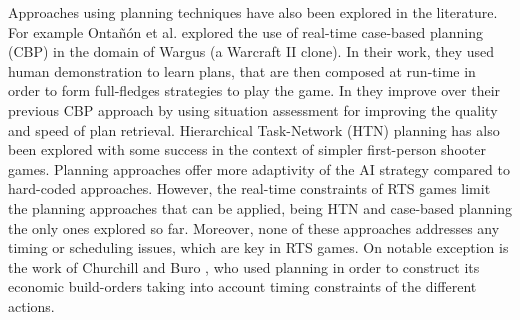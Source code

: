 \documentclass[journal]{IEEEtran}
\begin{document}


Approaches using planning techniques have also been explored in the literature. For example Onta\~{n}\'{o}n et al. \cite{CBR_Planning} explored the use of real-time case-based planning (CBP) in the domain of Wargus (a Warcraft II clone). In their work, they used human demonstration to learn plans, that are then composed at run-time in order to form full-fledges strategies to play the game. In \cite{PlanRetrieval} they improve over  their previous CBP approach by using situation assessment for improving the quality and speed of plan retrieval. Hierarchical Task-Network (HTN) planning has also been explored with some success in the context of simpler first-person shooter games. Planning approaches offer more adaptivity of the AI strategy compared to hard-coded approaches. However, the real-time constraints of RTS games limit the planning approaches that can be applied, being HTN and case-based planning the only ones explored so far. Moreover, none of these approaches addresses any timing or scheduling issues, which are key in RTS games. On notable exception is the work of Churchill and Buro \cite{churchill2011build}, who used planning in order to construct its economic build-orders taking into account timing constraints of the different actions.
\end{document}
